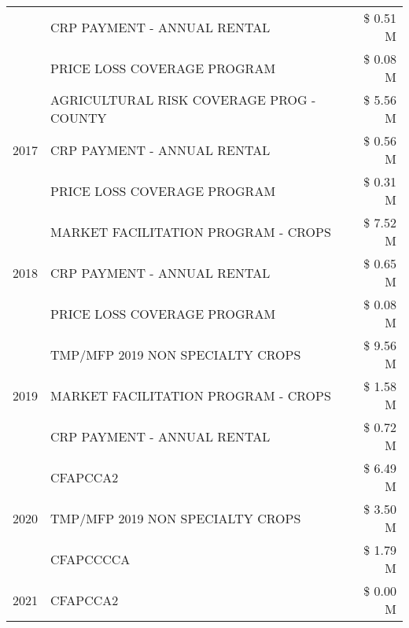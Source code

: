 \begin{tabular}{llr}
 & CRP PAYMENT - ANNUAL RENTAL & \$ 0.51 M \\
 & PRICE LOSS COVERAGE PROGRAM & \$ 0.08 M \\
\cline{1-3}
\multirow[t]{3}{*}{2017} & AGRICULTURAL RISK COVERAGE PROG - COUNTY & \$ 5.56 M \\
 & CRP PAYMENT - ANNUAL RENTAL & \$ 0.56 M \\
 & PRICE LOSS COVERAGE PROGRAM & \$ 0.31 M \\
\cline{1-3}
\multirow[t]{3}{*}{2018} & MARKET FACILITATION PROGRAM - CROPS & \$ 7.52 M \\
 & CRP PAYMENT - ANNUAL RENTAL & \$ 0.65 M \\
 & PRICE LOSS COVERAGE PROGRAM & \$ 0.08 M \\
\cline{1-3}
\multirow[t]{3}{*}{2019} & TMP/MFP 2019 NON SPECIALTY CROPS & \$ 9.56 M \\
 & MARKET FACILITATION PROGRAM - CROPS & \$ 1.58 M \\
 & CRP PAYMENT - ANNUAL RENTAL & \$ 0.72 M \\
\cline{1-3}
\multirow[t]{3}{*}{2020} & CFAPCCA2 & \$ 6.49 M \\
 & TMP/MFP 2019 NON SPECIALTY CROPS & \$ 3.50 M \\
 & CFAPCCCCA & \$ 1.79 M \\
\cline{1-3}
2021 & CFAPCCA2 & \$ 0.00 M \\
\cline{1-3}
\bottomrule
\end{tabular}
